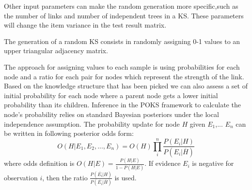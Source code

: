 Other input parameters can make the random generation more specific,such as the number of links and number of independent trees in a KS. These parameters will change the item variance in the test result matrix. 

The generation of a random KS consists in randomly assigning 0-1 values to an upper triangular adjacency matrix. 



The approach for assigning values to each sample is using probabilities for each node and a ratio for each pair for nodes which represent the strength of the link.  Based on the knowledge structure that has been picked  we can also assess a set of initial probability for each node where a parent node gets a lower initial probability than its children. Inference in the POKS framework to calculate the node's probability relies on standard Bayesian posteriors under the local independence assumption. The probability update for node $H$ given $E_1$,... $E_n$ can be written in following posterior odds form:
\begin{equation}
O(H|E_1,E_2, ... , E_n) = O(H) \prod_{i}^{n} \frac{P(E_i|H)}{P(E_i | \overline{H})}
\label{EQPOKSratio}
\end{equation}
where odds definition is $O(H|E) = \frac{P(H|E)}{1-P(H|E)}$. If evidence $E_i$ is negative for observation $i$, then the ratio $\frac{P(\overline{E_i}|H)}{P(\overline{E_i}|\overline{H})}$ is used.

